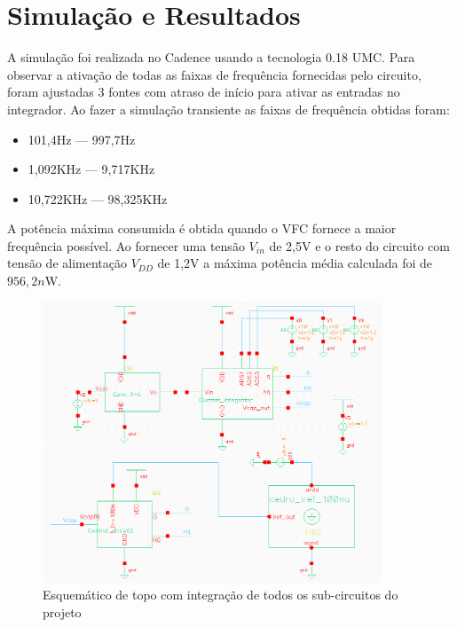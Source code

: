 \chapter[Simulação e Resultados]{Simulação e Resultados}

A simulação foi realizada no Cadence usando a tecnologia 0.18 UMC. Para observar a ativação de todas as faixas de frequência fornecidas pelo circuito, foram ajustadas 3 fontes com atraso de início para ativar as entradas no integrador. Ao fazer a simulação transiente as faixas de frequência obtidas foram:

\begin{itemize}
\item 101,4Hz	 \----	997,7Hz
\item 1,092KHz \----	9,717KHz
\item 10,722KHz \----	98,325KHz
\end{itemize}

A potência máxima consumida é obtida quando o VFC fornece a maior frequência possível. Ao fornecer uma tensão $V_{in}$ de 2,5V e o resto do circuito com tensão de alimentação $V_{DD}$ de 1,2V a máxima potência média calculada foi de $956,2n$W.


\begin{figure}[htb]
	\centering
	\includegraphics[width=0.9\textwidth]{figuras/imgs_jv/top.png}
	\caption{ Esquemático de topo com integração de todos os sub-circuitos do projeto }
	\label{fig16}
\end{figure}


